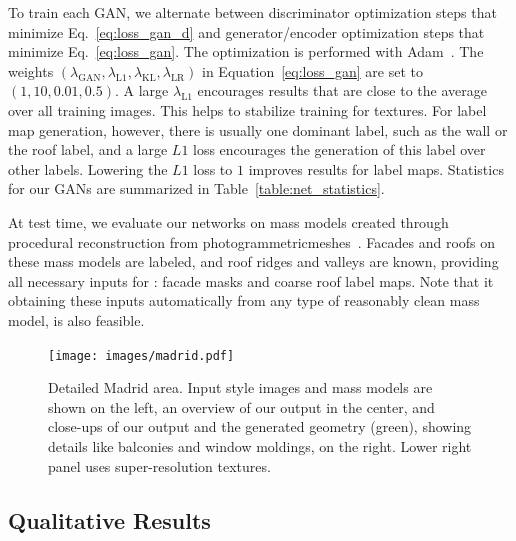 To train each GAN, we alternate between discriminator optimization steps that minimize Eq.~\ref{eq:loss_gan_d} and generator/encoder optimization steps that minimize Eq.~\ref{eq:loss_gan}. The optimization is performed with Adam~\cite{adam}. The weights $(\lambda_{\textrm{GAN}}, \lambda_{\textrm{L1}}, \lambda_{\textrm{KL}}, \lambda_{\textrm{LR}})$ in Equation~\ref{eq:loss_gan} are set to $(1, 10, 0.01, 0.5)$. A large $\lambda_{\textrm{L1}}$ encourages results that are close to the average over all training images. This helps to stabilize training for textures. For label map generation, however, there is usually one dominant label, such as the wall or the roof label, and a large $L1$ loss encourages the generation of this label over other labels. Lowering the $L1$ loss to $1$ improves results for label maps.
Statistics for our GANs are summarized in Table~\ref{table:net_statistics}.

At test time, we evaluate our networks on mass models created through procedural reconstruction from photogrammetric\linebreak meshes~\cite{Kelly:SIGA:2017}. Facades and roofs on these mass models are labeled, and roof ridges and valleys are known, providing all necessary inputs for \systemName: facade masks and coarse roof label maps. Note that it obtaining these inputs automatically from any type of reasonably clean mass model, is also feasible.

\begin{figure}[t!]
    \centering
    \texttt{[image: images/madrid.pdf]}
    \caption{Detailed Madrid area. Input style images and mass models are shown on the left, an overview of our output in the center, and close-ups of our output and the generated geometry (green), showing details like balconies and window moldings, on the right. Lower right panel uses  super-resolution textures.}
    \label{fig:madrid}
\end{figure}


\subsection{Qualitative Results}


